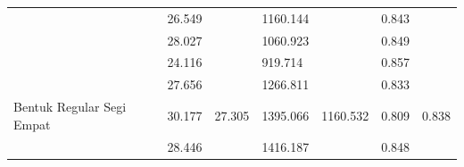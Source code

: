 \begin{table}[]
\begin{tabular}{|l|cc|cc|cc|}
                                                      & \multicolumn{1}{c|}{26.549}                         & \cellcolor[HTML]{FFFFFF}                         & \multicolumn{1}{c|}{1160.144}                         & \cellcolor[HTML]{FFFFFF}                           & \multicolumn{1}{c|}{0.843}                         & \cellcolor[HTML]{FFFFFF}                        \\ \cline{2-2} \cline{4-4} \cline{6-6}
                                                      & \multicolumn{1}{l|}{28.027}                         & \cellcolor[HTML]{FFFFFF}                         & \multicolumn{1}{l|}{1060.923}                         & \cellcolor[HTML]{FFFFFF}                           & \multicolumn{1}{l|}{0.849}                         & \cellcolor[HTML]{FFFFFF}                        \\ \cline{2-2} \cline{4-4} \cline{6-6}
                                                      & \multicolumn{1}{l|}{24.116}                         & \cellcolor[HTML]{FFFFFF}                         & \multicolumn{1}{l|}{919.714}                          & \cellcolor[HTML]{FFFFFF}                           & \multicolumn{1}{l|}{0.857}                         & \cellcolor[HTML]{FFFFFF}                        \\ \cline{2-2} \cline{4-4} \cline{6-6}
                                                      & \multicolumn{1}{l|}{27.656}                         & \cellcolor[HTML]{FFFFFF}                         & \multicolumn{1}{l|}{1266.811}                         & \cellcolor[HTML]{FFFFFF}                           & \multicolumn{1}{l|}{0.833}                         & \cellcolor[HTML]{FFFFFF}                        \\ \cline{2-2} \cline{4-4} \cline{6-6}
  \multirow{-5}{*}{Bentuk Regular Segi Empat}         & \multicolumn{1}{l|}{30.177}                         & \multirow{-5}{*}{\cellcolor[HTML]{FFFFFF}27.305} & \multicolumn{1}{l|}{1395.066}                         & \multirow{-5}{*}{\cellcolor[HTML]{FFFFFF}1160.532} & \multicolumn{1}{l|}{0.809}                         & \multirow{-5}{*}{\cellcolor[HTML]{FFFFFF}0.838} \\ \hline
                                                      & \multicolumn{1}{c|}{\cellcolor[HTML]{FFFFFF}28.446} & \cellcolor[HTML]{FFFFFF}                         & \multicolumn{1}{c|}{\cellcolor[HTML]{FFFFFF}1416.187} & \cellcolor[HTML]{FFFFFF}                           & \multicolumn{1}{c|}{\cellcolor[HTML]{FFFFFF}0.848} & \cellcolor[HTML]{FFFFFF}                        \\ \cline{2-2} \cline{4-4} \cline{6-6}

\end{tabular}
\end{table}
